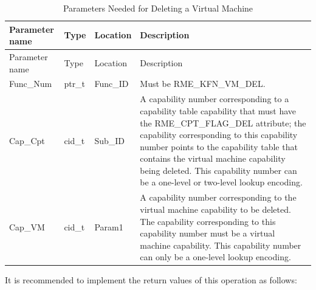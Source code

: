 \begin{xltabular}{\textwidth}{@{}>{\hsize\raggedright\arraybackslash}X>{\hsize\raggedright\arraybackslash}X>{\hsize\raggedright\arraybackslash}X>{\hsize\raggedright\arraybackslash}X@{}}
\caption{Parameters Needed for Deleting a Virtual Machine}\label{tab:8-75-delete-virtual-machine-parameters}\\
\toprule
Parameter name & Type & Location & Description\tabularnewline
\endfirsthead
\toprule
Parameter name & Type & Location & Description\tabularnewline
\midrule
\endhead
\bottomrule
\endlastfoot
Func\_Num & ptr\_t & Func\_ID & Must be RME\_KFN\_VM\_DEL.\tabularnewline
Cap\_Cpt & cid\_t & Sub\_ID &
A capability number corresponding to a capability table capability that must have the RME\_CPT\_FLAG\_DEL attribute; the capability corresponding to this capability number points to the capability table that contains the virtual machine capability being deleted. This capability number can be a one-level or two-level lookup encoding.\tabularnewline
Cap\_VM & cid\_t & Param1 &
A capability number corresponding to the virtual machine capability to be deleted. The capability corresponding to this capability number must be a virtual machine capability. This capability number can only be a one-level lookup encoding.\tabularnewline
\end{xltabular}
\nopagebreak[4]

\newpage
{}
It is recommended to implement the return values of this operation as follows:

